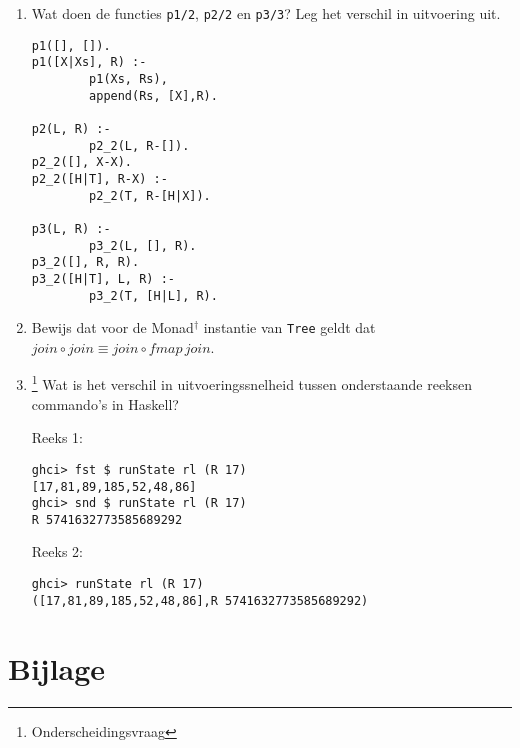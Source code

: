 \documentclass[kulak]{kulakarticle}
\begin{document}
	\begin{enumerate}
		\item Wat doen de functies \texttt{p1/2}, \texttt{p2/2} en \texttt{p3/3}? Leg het verschil in uitvoering uit.
\begin{verbatim}
p1([], []).
p1([X|Xs], R) :-
		p1(Xs, Rs),
		append(Rs, [X],R).

p2(L, R) :-
		p2_2(L, R-[]).
p2_2([], X-X).
p2_2([H|T], R-X) :-
		p2_2(T, R-[H|X]).

p3(L, R) :-
		p3_2(L, [], R).
p3_2([], R, R).
p3_2([H|T], L, R) :-
		p3_2(T, [H|L], R).
\end{verbatim}
		\item Bewijs dat voor de Monad\(^\dagger\) instantie van \texttt{Tree} geldt dat \(join \circ join \equiv join \circ fmap \, join\).
		\item \footnote{Onderscheidingsvraag} Wat is het verschil in uitvoeringssnelheid tussen onderstaande reeksen commando’s in Haskell?

		Reeks 1:
		\begin{verbatim}
ghci> fst $ runState rl (R 17)
[17,81,89,185,52,48,86]
ghci> snd $ runState rl (R 17)
R 5741632773585689292\end{verbatim}

		Reeks 2:
		\begin{verbatim}
ghci> runState rl (R 17)
([17,81,89,185,52,48,86],R 5741632773585689292)\end{verbatim}
	\end{enumerate}





\newpage
	\section*{Bijlage}
\end{document}
